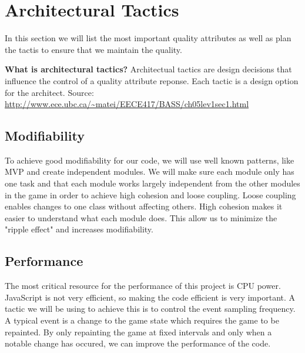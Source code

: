 \section{Architectural Tactics}
	In this section we will list the most important quality attributes as well as plan the tactis to 
	ensure that we maintain the quality.

	{\bf What is architectural tactics? }
	Architectual tactics are design decisions that influence the control of a quality attribute reponse. 
	Each tactic is a design option for the architect. 
	Source: \url{http://www.ece.ubc.ca/~matei/EECE417/BASS/ch05lev1sec1.html}

\subsection{Modifiability}
	To achieve good modifiability for our code, we will use well known patterns, like MVP and create 
	independent modules. We will make sure each module only has one task and that each module works 
	largely independent from the other modules in the game in order to achieve high cohesion and loose 
	coupling. Loose coupling enables changes to one class without affecting others. High cohesion makes 
	it easier to understand what each module does. This allow us to minimize the "ripple effect" and 
	increases modifiability.

\subsection{Performance}
	The most critical resource for the performance of this project is CPU power. JavaScript is not very 
	efficient, so making the code efficient is very important. A tactic we will be using to achieve this 
	is to control the event sampling frequency. A typical event is a change to the game state which 
	requires the game to be repainted. By only repainting the game at fixed intervals and only when a 
	notable change has occured, we can improve the performance of the code.